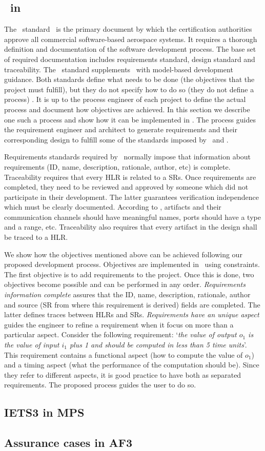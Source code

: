 
\subsection{\doone\ in \afthree}

The \doone\ standard~\cite{do178c} is the primary document by which the certification authorities approve all commercial software-based aerospace systems.
It requires a thorough definition and documentation of the software development process. 
The base set of required documentation includes requirements standard, design standard and traceability.
The \dothree\ standard supplements \doone\ with model-based development guidance.
Both standards define what needs to be done (the objectives that the project must fulfill), but they do not specify how to do so (they do not define a process) .
It is up to the process engineer of each project to define the actual process and document how objectives are achieved.
In this section we describe one such a process and show how it can be implemented in \afthree.
The process guides the requirement engineer and architect to generate requirements and their corresponding design to fulfill some of the standards imposed by \doone\ and \dothree.

Requirements standards required by \doone\ normally impose that information about requirements (ID, name, description, rationale, author, etc) is complete.
Traceability requires that every HLR is related to a SRs.
Once requirements are completed, they need to be reviewed and approved by someone which did not participate in their development. 
The latter guarantees verification independence~\cite{cast26} which must be clearly documented.
According to \dothree, artifacts and their communication channels should have meaningful names, ports should have a type and a range, etc.
Traceability also requires that every artifact in the design shall be traced to a HLR.

We show how the objectives mentioned above can be achieved following our proposed development process.
Objectives are implemented in \afthree\ using constraints.
The first objective is to add requirements to the project. 
Once this is done, two objectives become possible and can be performed in any order. 
\emph{Requirements information complete} assures that the ID, name, description, rationale, author and source (SR from where this requirement is derived) fields are completed. 
The latter defines traces between HLRs and SRs.
\emph{Requirements have an unique aspect} guides the engineer to refine a requirement when it focus on more than a particular aspect.
Consider the following requirement: `\emph{the value of output $o_1$ is the value of input $i_1$ plus 1 and should be computed in less than 5 time units}'.
This requirement contains a functional aspect (how to compute the value of $o_1$) and a timing aspect (what the performance of the computation should be).
Since they refer to different aspects, it is good practice to have both as separated requirements.
The proposed process guides the user to do so.

\subsection{IETS3 in MPS}
\label{sec:meta}


\subsection{Assurance cases in AF3}
